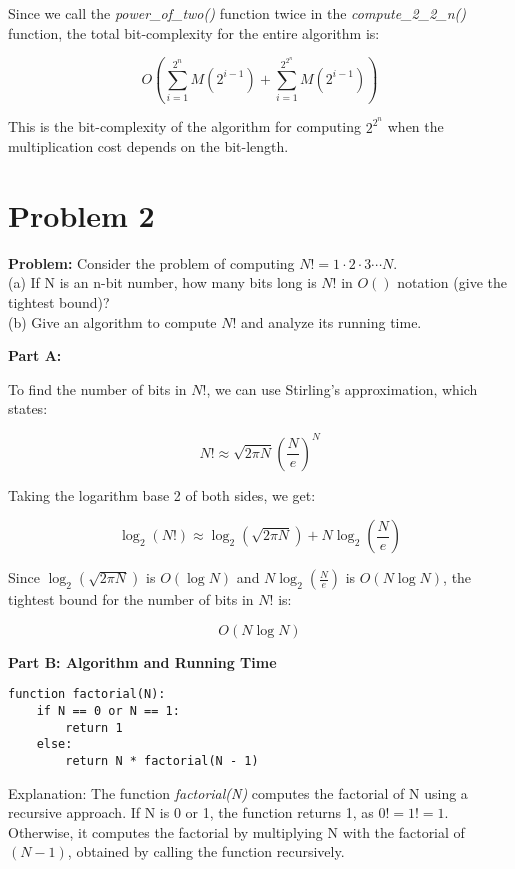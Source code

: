 \documentclass[11pt]{article}
\begin{document}
    Since we call the \textit{power\_of\_two()} function twice in the \textit{compute\_2\_2\_n()} function, the total bit-complexity for the entire algorithm is:

    $$
    O\left(\sum_{i=1}^{2^n} M\left(2^{i-1}\right) + \sum_{i=1}^{2^{2^n}} M\left(2^{i-1}\right)\right)
    $$

    This is the bit-complexity of the algorithm for computing $2^{2^n}$ when the multiplication cost depends on the bit-length.


    \section{Problem 2}

    \textbf{Problem:} Consider the problem of computing $N! = 1 \cdot 2 \cdot 3 \cdots N$. \\
    (a) If N is an n-bit number, how many bits long is $N!$ in $O()$ notation (give the tightest bound)? \\
    (b) Give an algorithm to compute $N!$ and analyze its running time.


    \textbf{Part A:}

    To find the number of bits in $N!$, we can use Stirling's approximation, which states:

    $$
    N! \approx \sqrt{2\pi N} \left(\frac{N}{e}\right)^N
    $$

    Taking the logarithm base 2 of both sides, we get:

    $$
    \log_2 (N!) \approx \log_2(\sqrt{2\pi N}) + N \log_2\left(\frac{N}{e}\right)
    $$

    Since $\log_2(\sqrt{2\pi N})$ is $O(\log N)$ and $N\log_2\left(\frac{N}{e}\right)$ is $O(N\log N)$, the tightest bound for the number of bits in $N!$ is:

    $$
    O(N\log N)
    $$

    \textbf{Part B: Algorithm and Running Time}

    \begin{verbatim}
function factorial(N):
    if N == 0 or N == 1:
        return 1
    else:
        return N * factorial(N - 1)
    \end{verbatim}

    Explanation: The function \textit{factorial(N)} computes the factorial of N using a recursive approach. If N is 0 or 1, the function returns 1, as $0! = 1! = 1$. Otherwise, it computes the factorial by multiplying N with the factorial of $(N-1)$, obtained by calling the function recursively.
\end{document}
